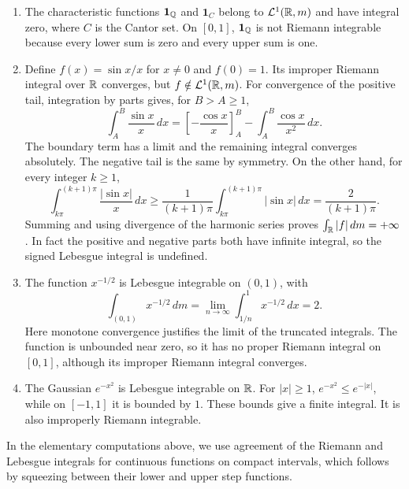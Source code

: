 \begin{example}
  \leavevmode
  \begin{enumerate}[label=(\roman*)]
    \item The characteristic functions $\mathbf 1_{\mathbb{Q}}$ and
      $\mathbf 1_C$ belong to $\mathcal L^1(\mathbb{R},m)$ and have integral
      zero, where $C$ is the Cantor set. On $[0,1]$,
      $\mathbf 1_{\mathbb{Q}}$ is not Riemann integrable because every
      lower sum is zero and every upper sum is one.
    \item Define $f(x)=\sin x/x$ for $x\neq0$ and $f(0)=1$.
      Its improper Riemann integral over $\mathbb{R}$ converges, but
      $f\notin\mathcal L^1(\mathbb{R},m)$. For convergence of the positive
      tail, integration by parts gives, for $B>A\geq1$,
      \[
        \int_A^B\frac{\sin x}{x}\,dx
          =\left[-\frac{\cos x}{x}\right]_A^B
             -\int_A^B\frac{\cos x}{x^2}\,dx.
      \]
      The boundary term has a limit and the remaining integral
      converges absolutely. The negative tail is the same by symmetry.
      On the other hand, for every integer $k\geq1$,
      \[
        \int_{k\pi}^{(k+1)\pi}\frac{|\sin x|}{x}\,dx
          \geq\frac1{(k+1)\pi}
            \int_{k\pi}^{(k+1)\pi}|\sin x|\,dx
          =\frac2{(k+1)\pi}.
      \]
      Summing and using divergence of the harmonic series proves
      $\int_{\mathbb{R}}|f|\,dm=+\infty$. In fact the positive and negative
      parts both have infinite integral, so the signed Lebesgue
      integral is undefined.
    \item The function $x^{-1/2}$ is Lebesgue integrable on $(0,1)$,
      with
      \[
        \int_{(0,1)}x^{-1/2}\,dm
          =\lim_{n\to\infty}\int_{1/n}^1x^{-1/2}\,dx=2.
      \]
      Here monotone convergence justifies the limit of the truncated
      integrals. The function is unbounded near zero, so it has no
      proper Riemann integral on $[0,1]$, although its improper
      Riemann integral converges.
    \item The Gaussian $e^{-x^2}$ is Lebesgue integrable on $\mathbb{R}$.
      For $|x|\geq1$, $e^{-x^2}\leq e^{-|x|}$, while on $[-1,1]$
      it is bounded by $1$. These bounds give a finite integral.
      It is also improperly Riemann integrable.
  \end{enumerate}
  In the elementary computations above, we use agreement of the
  Riemann and Lebesgue integrals for continuous functions on compact
  intervals, which follows by squeezing between their lower and
  upper step functions.
\end{example}

